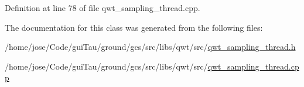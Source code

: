Definition at line 78 of file qwt\-\_\-sampling\-\_\-thread.\-cpp.



The documentation for this class was generated from the following files\-:\begin{DoxyCompactItemize}
\item 
/home/jose/\-Code/gui\-Tau/ground/gcs/src/libs/qwt/src/\hyperlink{qwt__sampling__thread_8h}{qwt\-\_\-sampling\-\_\-thread.\-h}\item 
/home/jose/\-Code/gui\-Tau/ground/gcs/src/libs/qwt/src/\hyperlink{qwt__sampling__thread_8cpp}{qwt\-\_\-sampling\-\_\-thread.\-cpp}\end{DoxyCompactItemize}
